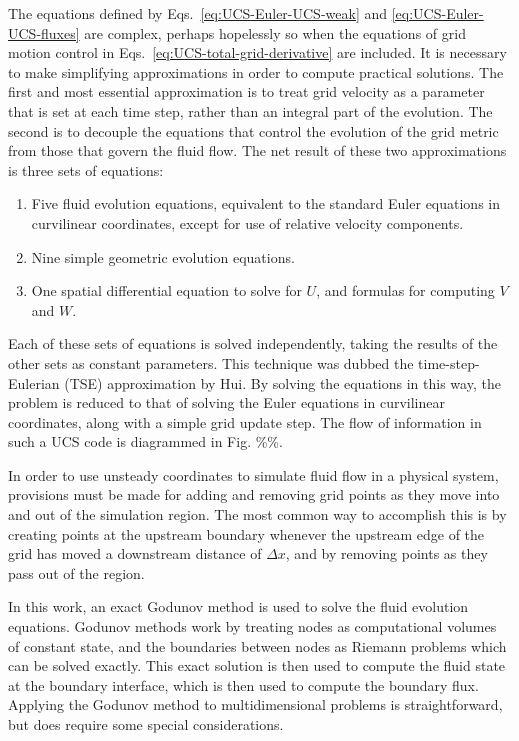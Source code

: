 The equations defined by Eqs.~\ref{eq:UCS-Euler-UCS-weak} and \ref{eq:UCS-Euler-UCS-fluxes} are complex, perhaps hopelessly so when the equations of grid motion control in Eqs.~\ref{eq:UCS-total-grid-derivative} are included. It is necessary to make simplifying approximations in order to compute practical solutions. The first and most essential approximation is to treat grid velocity as a parameter that is set at each time step, rather than an integral part of the evolution. The second is to decouple the equations that control the evolution of the grid metric from those that govern the fluid flow. The net result of these two approximations is three sets of equations:
\begin{enumerate}
\item Five fluid evolution equations, equivalent to the standard Euler equations in curvilinear coordinates, except for use of relative velocity components.
\item Nine simple geometric evolution equations.
\item One spatial differential equation to solve for $U$, and formulas for computing $V$ and $W$.
\end{enumerate}
Each of these sets of equations is solved independently, taking the results of the other sets as constant parameters. This technique was dubbed the time-step-Eulerian (TSE) approximation by Hui\cite{Hui1999}. By solving the equations in this way, the problem is reduced to that of solving the Euler equations in curvilinear coordinates, along with a simple grid update step. The flow of information in such a UCS code is diagrammed in Fig. \%\%.

In order to use unsteady coordinates to simulate fluid flow in a physical system, provisions must be made for adding and removing grid points as they move into and out of the simulation region. The most common way to accomplish this is by creating points at the upstream boundary whenever the upstream edge of the grid has moved a downstream distance of $\Delta x$, and by removing points as they pass out of the region. 

In this work, an exact Godunov method is used to solve the fluid evolution equations. Godunov methods work by treating nodes as computational volumes of constant state, and the boundaries between nodes as Riemann problems which can be solved exactly. This exact solution is then used to compute the fluid state at the boundary interface, which is then used to compute the boundary flux. Applying the Godunov method to multidimensional problems is straightforward, but does require some special considerations.

